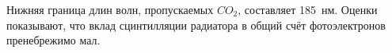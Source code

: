 Нижняя граница длин волн, пропускаемых $CO_{2}$, составляет 185~нм. Оценки показывают, что вклад сцинтилляции радиатора в общий счёт фотоэлектронов пренебрежимо мал.





